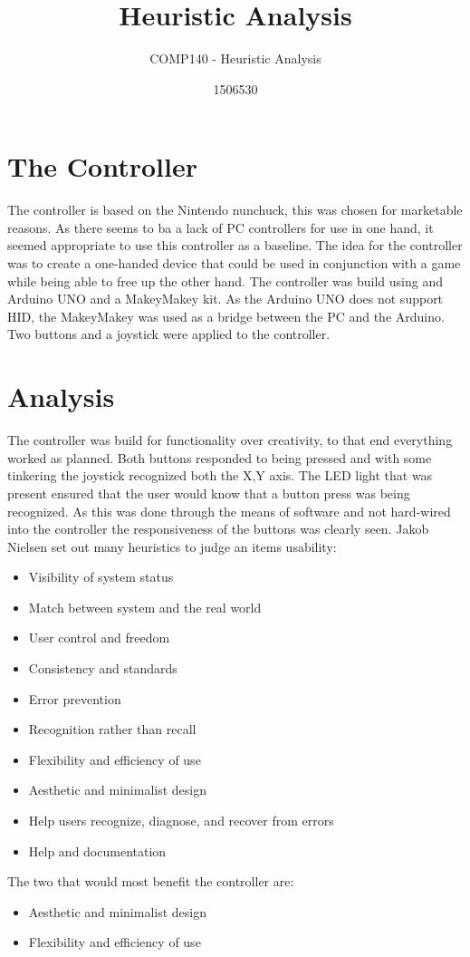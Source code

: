 \documentclass{scrartcl}
\title{Heuristic Analysis}
\subtitle{COMP140 - Heuristic Analysis}
\author{1506530}
\begin{document}
\maketitle

\section{The Controller}
The controller is based on the Nintendo nunchuck, this was chosen for marketable reasons. As there seems to ba a lack of PC controllers for use in one hand, it seemed appropriate to use this controller as a baseline. The idea for the controller was to create a one-handed device that could be used in conjunction with a game while being able to free up the other hand. The controller was build using and Arduino UNO and a MakeyMakey kit. As the Arduino UNO does not support HID, the MakeyMakey was used as a bridge between the PC and the Arduino. Two buttons and a joystick were applied to the controller.

\section{Analysis}
The controller was build for functionality over creativity, to that end everything worked as planned. Both buttons responded to being pressed and with some tinkering the joystick recognized both the X,Y axis. The LED light that was present ensured that the user would know that a button press was being recognized. As this was done through the means of software and not hard-wired into the controller the responsiveness of the buttons was clearly seen. 
\newline Jakob Nielsen set out many heuristics to judge an items usability:
\begin{itemize}
	\item Visibility of system status
	\item Match between system and the real world
	\item User control and freedom	
	\item Consistency and standards
	\item Error prevention
	\item Recognition rather than recall
	\item Flexibility and efficiency of use
	\item Aesthetic and minimalist design
	\item Help users recognize, diagnose, and recover from errors	
	\item Help and documentation \cite{niel}
	\newline
	\newline
\end{itemize}
The two that would most benefit the controller are: 
\begin{itemize}
	\item Aesthetic and minimalist design
	\item Flexibility and efficiency of use
	\newline
		\newline
			\newline
				\newline
\end{itemize}
\end{document}
